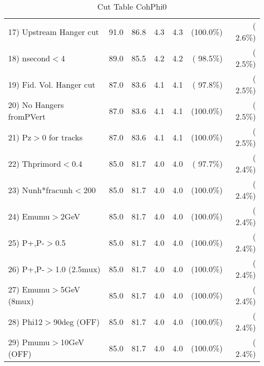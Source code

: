 \begin{table}[h!]
\begin{tabular}{||l||r|r|r|r|r|r||}
 17) Upstream Hanger cut  &         91.0 &         86.8 &          4.3 &          4.3 & (100.0\%) & (  2.6\%) \\
 18) nsecond$<$4          &         89.0 &         85.5 &          4.2 &          4.2 & ( 98.5\%) & (  2.5\%) \\
 19) Fid. Vol. Hanger cut &         87.0 &         83.6 &          4.1 &          4.1 & ( 97.8\%) & (  2.5\%) \\
 20) No Hangers fromPVert &         87.0 &         83.6 &          4.1 &          4.1 & (100.0\%) & (  2.5\%) \\
 21) Pz$>$0 for tracks    &         87.0 &         83.6 &          4.1 &          4.1 & (100.0\%) & (  2.5\%) \\
 22) Thprimord$<$0.4      &         85.0 &         81.7 &          4.0 &          4.0 & ( 97.7\%) & (  2.4\%) \\
 23) Nunh*fracunh$<$200   &         85.0 &         81.7 &          4.0 &          4.0 & (100.0\%) & (  2.4\%) \\
 24) Emumu$>$2GeV         &         85.0 &         81.7 &          4.0 &          4.0 & (100.0\%) & (  2.4\%) \\
 25) P+,P-$>$0.5          &         85.0 &         81.7 &          4.0 &          4.0 & (100.0\%) & (  2.4\%) \\
 26) P+,P-$>$1.0 (2.5mux) &         85.0 &         81.7 &          4.0 &          4.0 & (100.0\%) & (  2.4\%) \\
 27) Emumu$>$5GeV  (8mux) &         85.0 &         81.7 &          4.0 &          4.0 & (100.0\%) & (  2.4\%) \\
 28) Phi12$>$90deg  (OFF) &         85.0 &         81.7 &          4.0 &          4.0 & (100.0\%) & (  2.4\%) \\
 29) Pmumu$>$10GeV  (OFF) &         85.0 &         81.7 &          4.0 &          4.0 & (100.0\%) & (  2.4\%) \\
 \hline
 \hline
 \end{tabular}
 \caption{Cut Table  CohPhi0  }
 \label{tab-cutcohjpsi-mumu_cohphi0}
 \end{table}
